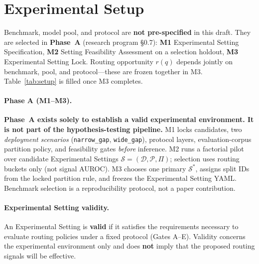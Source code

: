 \section{Experimental Setup}
\label{sec:experimental-setup}

Benchmark, model pool, and protocol are \textbf{not pre-specified} in this draft.
They are selected in \textbf{Phase~A} (research program \S0.7):
\textbf{M1} Experimental Setting Specification,
\textbf{M2} Setting Feasibility Assessment on a selection holdout,
\textbf{M3} Experimental Setting Lock.
Routing opportunity $r(q)$ depends jointly on benchmark, pool, and protocol---these are frozen together in M3.
Table~\ref{tab:setup} is filled once M3 completes.



\paragraph{Phase A (M1--M3).}
\textbf{Phase~A exists solely to establish a valid experimental environment. It is not part of the hypothesis-testing pipeline.}
M1 locks candidates, two \emph{deployment scenarios} (\texttt{narrow\_gap}, \texttt{wide\_gap}), protocol layers, evaluation-corpus partition policy, and feasibility gates \emph{before} inference.
M2 runs a factorial pilot over candidate Experimental Settings $\mathcal{S}=(\mathcal{D},\mathcal{P},\Pi)$; selection uses routing buckets only (not signal AUROC).
M3 chooses one primary $\mathcal{S}^*$, assigns split IDs from the locked partition rule, and freezes the Experimental Setting YAML.
Benchmark selection is a reproducibility protocol, not a paper contribution.

\paragraph{Experimental Setting validity.}
An Experimental Setting is \textbf{valid} if it satisfies the requirements necessary to evaluate routing policies under a fixed protocol (Gates A--E).
Validity concerns the experimental environment only and does \textbf{not} imply that the proposed routing signals will be effective.

